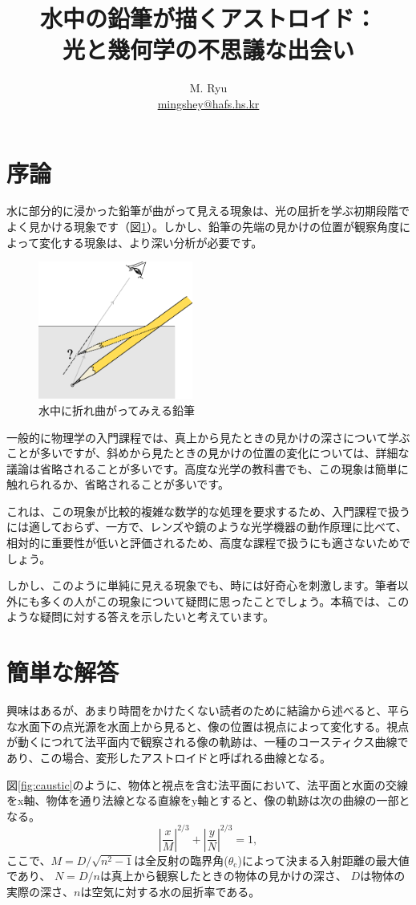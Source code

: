 \documentclass[twocolumn]{article}
\title{水中の鉛筆が描くアストロイド：\\光と幾何学の不思議な出会い}
\author{M. Ryu \\ {\href{mailto:mingshey@hafs.hs.kr}{mingshey@hafs.hs.kr}}}
\begin{document}
\renewcommand{\figurename}{図}
\section{序論}

水に部分的に浸かった鉛筆が曲がって見える現象は、光の屈折を学ぶ初期段階でよく見かける現象です（図\ref{fig:pencil}）。しかし、鉛筆の先端の見かけの位置が観察角度によって変化する現象は、より深い分析が必要です。

\begin{figure}[ht]
	\centering
	\includegraphics[width=2in]{figs/g164.eps}
	\caption{水中に折れ曲がってみえる鉛筆}
	\label{fig:pencil}
\end{figure}

一般的に物理学の入門課程では、真上から見たときの見かけの深さについて学ぶことが多いですが、斜めから見たときの見かけの位置の変化については、詳細な議論は省略されることが多いです。高度な光学の教科書でも、この現象は簡単に触れられるか、省略されることが多いです。

これは、この現象が比較的複雑な数学的な処理を要求するため、入門課程で扱うには適しておらず、一方で、レンズや鏡のような光学機器の動作原理に比べて、相対的に重要性が低いと評価されるため、高度な課程で扱うにも適さないためでしょう。

しかし、このように単純に見える現象でも、時には好奇心を刺激します。筆者以外にも多くの人がこの現象について疑問に思ったことでしょう。本稿では、このような疑問に対する答えを示したいと考えています。

\section{簡単な解答}

興味はあるが、あまり時間をかけたくない読者のために結論から述べると、平らな水面下の点光源を水面上から見ると、像の位置は視点によって変化する。視点が動くにつれて法平面内で観察される像の軌跡は、一種のコースティクス曲線であり、この場合、変形したアストロイドと呼ばれる曲線となる。

図\ref{fig:caustic}のように、物体と視点を含む法平面において、法平面と水面の交線をx軸、物体を通り法線となる直線をy軸とすると、像の軌跡は次の曲線の一部となる。
$$ \left| \dfrac{x}{M} \right| ^ {2/3} 
+ \left| \dfrac{y}{N} \right| ^ {2/3} = 1,$$
ここで、$M = D/\sqrt{n^2 - 1}$は全反射の臨界角($\theta_{\mathrm{c}}$)によって決まる入射距離の最大値であり、
$N = D/n$は真上から観察したときの物体の見かけの深さ、
$D$は物体の実際の深さ、$n$は空気に対する水の屈折率である。
\end{document}
